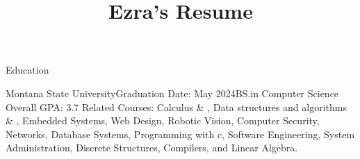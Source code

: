 \documentclass{resume} %
\begin{document}
\title{Ezra's Resume}

\begin{rSection}{Education}

\begin{rSubsection}{Montana State University}{Graduation Date: May 2024}{BS.in Computer Science }{Overall GPA: 3.7}
{Related Courses:} {Calculus  \& , Data structures and algorithms  \& , Embedded Systems, Web Design, Robotic Vision, Computer Security, Networks, Database Systems, Programming with c, Software Engineering, System Administration, Discrete Structures, Compilers, and Linear Algebra.}

\end{rSubsection}


\vspace{-.65cm}
\item[]

\end{rSection}

\end{document}
